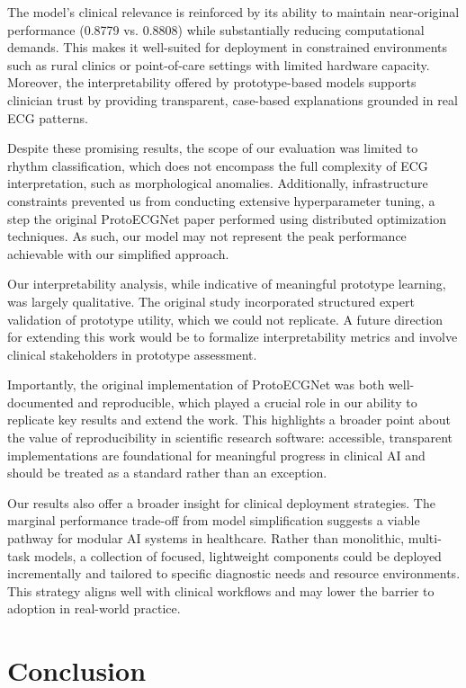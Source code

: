 The model's clinical relevance is reinforced by its ability to maintain near-original performance (0.8779 vs. 0.8808) while substantially reducing computational demands. This makes it well-suited for deployment in constrained environments such as rural clinics or point-of-care settings with limited hardware capacity. Moreover, the interpretability offered by prototype-based models supports clinician trust by providing transparent, case-based explanations grounded in real ECG patterns.

Despite these promising results, the scope of our evaluation was limited to rhythm classification, which does not encompass the full complexity of ECG interpretation, such as morphological anomalies. Additionally, infrastructure constraints prevented us from conducting extensive hyperparameter tuning, a step the original ProtoECGNet paper performed using distributed optimization techniques. As such, our model may not represent the peak performance achievable with our simplified approach.

Our interpretability analysis, while indicative of meaningful prototype learning, was largely qualitative. The original study incorporated structured expert validation of prototype utility, which we could not replicate. A future direction for extending this work would be to formalize interpretability metrics and involve clinical stakeholders in prototype assessment.

Importantly, the original implementation of ProtoECGNet was both well-documented and reproducible, which played a crucial role in our ability to replicate key results and extend the work. This highlights a broader point about the value of reproducibility in scientific research software: accessible, transparent implementations are foundational for meaningful progress in clinical AI and should be treated as a standard rather than an exception.

Our results also offer a broader insight for clinical deployment strategies. The marginal performance trade-off from model simplification suggests a viable pathway for modular AI systems in healthcare. Rather than monolithic, multi-task models, a collection of focused, lightweight components could be deployed incrementally and tailored to specific diagnostic needs and resource environments. This strategy aligns well with clinical workflows and may lower the barrier to adoption in real-world practice.

\section{Conclusion}


